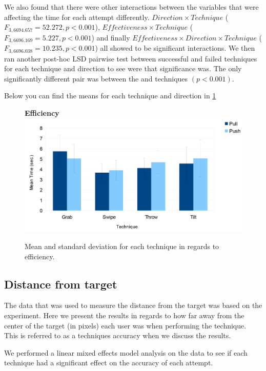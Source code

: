 We also found that there were other interactions between the variables that were affecting the time for each attempt differently. 
$Direction \times Technique$  ($F_{3,6694.657} = 52.272, p < 0.001$), $Effectiveness \times Technique$  ($F_{3,6696.169} = 5.227, p < 0.001$) and finally $Effectiveness \times Direction \times Technique$  ($F_{3,6696.038} = 10.235, p < 0.001$) all showed to be significant interactions. 
We then ran another post-hoc LSD pairwise test between successful and failed techniques for each technique and direction to see were that significance was. 
The only significantly different pair was between the \grab \push and \grab \pull techniques $(p < 0.001)$.

Below you can find the means for each technique and direction in \cref{fig:efficiencyGraph}

\begin{figure}[H]{
	\centering
	\textbf{Efficiency}\\[4pt]
	\includegraphics[width = 1\columnwidth ]{images/time_graph.pdf}} 
	\caption{
		Mean and standard deviation for each technique in regards to efficiency.
	}
	\label{fig:efficiencyGraph}
\end{figure}

\subsection{Distance from target}
The data that was used to measure the distance from the target was based on the \accuracy experiment.
Here we present the results in regards to how far away from the center of the target (in pixels) each user was when performing the technique. 
This is referred to as a techniques accuracy when we discuss the results. 

We performed a linear mixed effects model analysis on the data to see if each technique had a significant effect on the accuracy of each attempt. 

